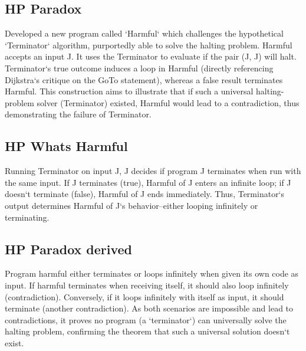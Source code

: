 \subsection*{HP  Paradox}
Developed a new program called `Harmful` which challenges the hypothetical `Terminator` algorithm, purportedly able to solve the halting problem.
Harmful accepts an input J\@.
It uses the Terminator to evaluate if the pair (J, J) will halt.
Terminator`s true outcome induces a loop in Harmful (directly referencing Dijkstra`s critique on the GoTo statement), whereas a false result terminates Harmful.
This construction aims to illustrate that if such a universal halting-problem solver (Terminator) existed, Harmful would lead to a contradiction, thus demonstrating the failure of Terminator.

\subsection*{HP  Whats Harmful}
Running Terminator on input J, J decides if program J terminates when run with the same input.
If J terminates (true), Harmful of J enters an infinite loop; if J doesn`t terminate (false), Harmful of J ends immediately.
Thus, Terminator`s output determines Harmful of J`s behavior--either looping infinitely or terminating.

\subsection*{HP  Paradox derived}
Program harmful either terminates or loops infinitely when given its own code as input.
If harmful terminates when receiving itself, it should also loop infinitely (contradiction).
Conversely, if it loops infinitely with itself as input, it should terminate (another contradiction).
As both scenarios are impossible and lead to contradictions, it proves no program (a `terminator`) can universally solve the halting problem, confirming the theorem that such a universal solution doesn`t exist.

